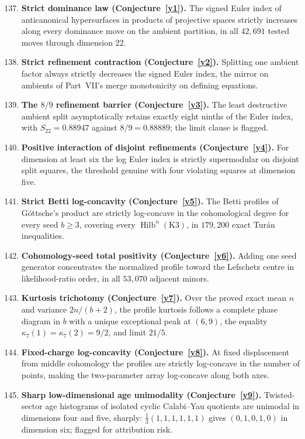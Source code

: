 \documentclass[11pt]{article}
\theoremstyle{definition}
\begin{document}
\begin{enumerate}\setcounter{enumi}{136}
\item \textbf{Strict dominance law (Conjecture~\ref{y1}).}  The signed Euler index of anticanonical hypersurfaces in products of projective spaces strictly increases along every dominance move on the ambient partition, in all $42{,}691$ tested moves through dimension $22$.
\item \textbf{Strict refinement contraction (Conjecture~\ref{y2}).}  Splitting one ambient factor always strictly decreases the signed Euler index, the mirror on ambients of Part~VII's merge monotonicity on defining equations.
\item \textbf{The $8/9$ refinement barrier (Conjecture~\ref{y3}).}  The least destructive ambient split asymptotically retains exactly eight ninths of the Euler index, with $S_{22}=0.88947$ against $8/9=0.88889$; the limit clause is flagged.
\item \textbf{Positive interaction of disjoint refinements (Conjecture~\ref{y4}).}  For dimension at least six the log Euler index is strictly supermodular on disjoint split squares, the threshold genuine with four violating squares at dimension five.
\item \textbf{Strict Betti log-concavity (Conjecture~\ref{y5}).}  The Betti profiles of G\"ottsche's product are strictly log-concave in the cohomological degree for every seed $b\ge3$, covering every $\operatorname{Hilb}^n(\mathrm{K3})$, in $179{,}200$ exact Tur\'an inequalities.
\item \textbf{Cohomology-seed total positivity (Conjecture~\ref{y6}).}  Adding one seed generator concentrates the normalized profile toward the Lefschetz centre in likelihood-ratio order, in all $53{,}070$ adjacent minors.
\item \textbf{Kurtosis trichotomy (Conjecture~\ref{y7}).}  Over the proved exact mean $n$ and variance $2n/(b+2)$, the profile kurtosis follows a complete phase diagram in $b$ with a unique exceptional peak at $(6,9)$, the equality $\kappa_7(1)=\kappa_7(2)=9/2$, and limit $21/5$.
\item \textbf{Fixed-charge log-concavity (Conjecture~\ref{y8}).}  At fixed displacement from middle cohomology the profiles are strictly log-concave in the number of points, making the two-parameter array log-concave along both axes.
\item \textbf{Sharp low-dimensional age unimodality (Conjecture~\ref{y9}).}  Twisted-sector age histograms of isolated cyclic Calabi--Yau quotients are unimodal in dimensions four and five, sharply: $\tfrac13(1,1,1,1,1,1)$ gives $(0,1,0,1,0)$ in dimension six; flagged for attribution risk.

\end{enumerate}
\end{document}
